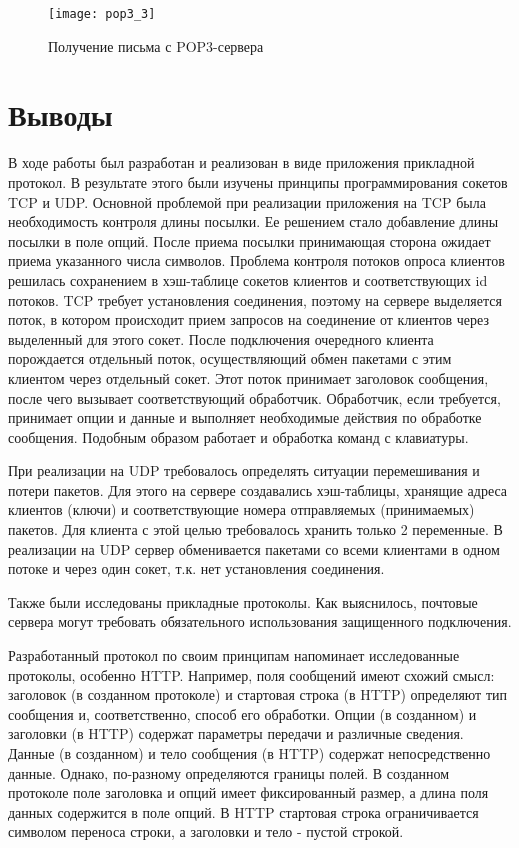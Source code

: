 \begin{figure}[H]
	\begin{center}
		\texttt{[image: pop3\_3]}
		\caption{Получение письма с POP3-сервера} 
		\label{pic:pic_name} %
	\end{center}
\end{figure}

\section{Выводы}

В ходе работы был разработан и реализован в виде приложения прикладной протокол. В результате этого были изучены принципы программирования сокетов TCP и UDP. Основной проблемой при реализации приложения на TCP была необходимость контроля длины посылки. Ее решением стало добавление длины посылки в поле опций. После приема посылки принимающая сторона ожидает приема указанного числа символов. Проблема контроля потоков опроса клиентов решилась сохранением в хэш-таблице сокетов клиентов и соответствующих id потоков. TCP требует установления соединения, поэтому на сервере выделяется поток, в котором происходит прием запросов на соединение от клиентов через выделенный для этого сокет. После подключения очередного клиента порождается отдельный поток, осуществляющий обмен пакетами с этим клиентом через отдельный сокет. Этот поток принимает заголовок сообщения, после чего вызывает соответствующий обработчик. Обработчик, если требуется, принимает опции и данные и выполняет необходимые действия по обработке сообщения. Подобным образом работает и обработка команд с клавиатуры.

При реализации на UDP требовалось определять ситуации перемешивания и потери пакетов. Для этого на сервере создавались хэш-таблицы, хранящие адреса клиентов (ключи) и соответствующие номера отправляемых (принимаемых) пакетов. Для клиента с этой целью требовалось хранить только 2 переменные. В реализации на UDP сервер обменивается пакетами со всеми клиентами в одном потоке и через один сокет, т.к. нет установления соединения.

Также были исследованы прикладные протоколы. Как выяснилось, почтовые сервера могут требовать обязательного использования защищенного подключения.

Разработанный протокол по своим принципам напоминает исследованные протоколы, особенно HTTP. Например, поля сообщений имеют схожий смысл: заголовок (в созданном протоколе) и стартовая строка (в HTTP) определяют тип сообщения и, соответственно, способ его обработки. Опции (в созданном) и заголовки (в HTTP) содержат параметры передачи и различные сведения. Данные (в созданном) и тело сообщения (в HTTP) содержат непосредственно данные. Однако, по-разному определяются границы полей. В созданном протоколе поле заголовка и опций имеет фиксированный размер, а длина поля данных содержится в поле опций. В HTTP стартовая строка ограничивается символом переноса строки, а заголовки и тело - пустой строкой.

